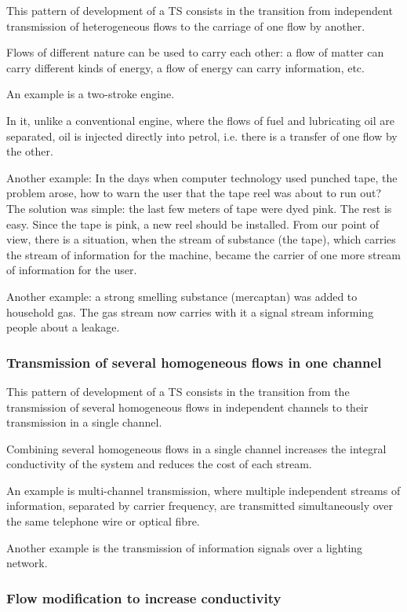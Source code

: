 \documentclass[a4paper,11pt]{article}
\begin{document}
This pattern of development of a TS consists in the transition from
independent transmission of heterogeneous flows to the carriage of one flow by
another.

Flows of different nature can be used to carry each other: a flow of matter
can carry different kinds of energy, a flow of energy can carry information,
etc.

An example is a two-stroke engine.

In it, unlike a conventional engine, where the flows of fuel and lubricating
oil are separated, oil is injected directly into petrol, i.e. there is a
transfer of one flow by the other.

Another example: In the days when computer technology used punched tape, the
problem arose, how to warn the user that the tape reel was about to run out?
The solution was simple: the last few meters of tape were dyed pink. The rest
is easy. Since the tape is pink, a new reel should be installed. From our
point of view, there is a situation, when the stream of substance (the tape),
which carries the stream of information for the machine, became the carrier of
one more stream of information for the user.

Another example: a strong smelling substance (mercaptan) was added to
household gas. The gas stream now carries with it a signal stream informing
people about a leakage.

\subsubsection{Transmission of several homogeneous flows in one channel}

This pattern of development of a TS consists in the transition from the
transmission of several homogeneous flows in independent channels to their
transmission in a single channel.

Combining several homogeneous flows in a single channel increases the integral
conductivity of the system and reduces the cost of each stream.

An example is multi-channel transmission, where multiple independent streams
of information, separated by carrier frequency, are transmitted simultaneously
over the same telephone wire or optical fibre.

Another example is the transmission of information signals over a lighting
network.

\subsubsection{Flow modification to increase conductivity}
\end{document}
